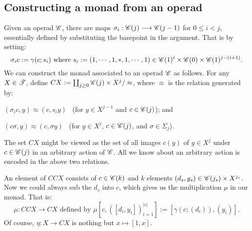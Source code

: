 \documentclass[11pt]{article}
\begin{document}
\begin{chapter1-3}
\subsection{Constructing a monad from an operad}
Given an operad $\mathscr{C}$, there are maps $\sigma_i:\mathscr{C}(j)\longrightarrow\mathscr{C}(j-1)$ for
$0\leq i<j$, essentially defined by substituting the basepoint in the \iTH
argument. That is by setting:
\[\sigma_ic:=\gamma(c;s_i)\text{ where }s_i:=(1,\cdots,1,*,1,\cdots,1)\in \mathscr{C}(1)^i\times \mathscr{C}(0)\times\mathscr{C}(1)^{j-(i+1)}.\]
We can construct the monad associated to an operad $\mathscr{C}$ as follows. For any
$X\in\mathscr{T}$, define $CX:=\coprod_{j\geq0}\mathscr{C}(j)\times X^j/\approx$, where
$\approx$ is the relation generated by:
\begin{itemise}
\item $(\sigma_ic,y)\approx (c,s_iy)$ \ (for $y\in X^{j-1}$ and $c\in \mathscr{C}(j)$); and
\item $(c\sigma,y)\approx (c,\sigma y)$ \ (for $y\in X^{j}$, $c\in \mathscr{C}(j)$, and $\sigma\in\Sigma_j$).
\end{itemise}
The set $CX$ might be viewed as the set of all images $c(y)$ of $y\in X^j$ under $c\in\mathscr{C}(j)$ in an arbitrary action of $\mathscr{C}$. All we know about an arbitrary action is encoded in the above two relations.


An element of $CCX$ consists of $c\in \mathscr{C}(k)$ and $k$ elements 
$(d_s,y_s)\in \mathscr{C}(j_s)\times X^{j_s}$. Now we could always sub the $d_s$
into $c$, which gives us the multiplication $\mu$ in our monad. That is:
\[\mu:CCX\to CX\text{ defined by }
\mu[c,([d_i,y_i])_{i=1}^{|c|}]:=[\gamma(c;(d_i)),(y_i)].\]
Of course, $\eta:X\to CX$ is nothing but $x\mapsto [1,x]$.


\end{chapter1-3}
\end{document}
